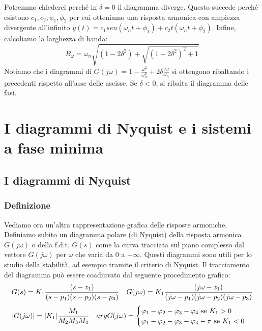 \documentclass[11pt]{article}
\begin{document}
Potremmo chiederci perché in $\delta=0$ il diagramma diverge. Questo succede perché esistono $c_1,c_2, \phi_1, \phi_2$ per cui otteniamo una risposta armonica con ampiezza divergente all'infinito $y(t)=c_1sen(\omega_nt+\phi_1)+c_2t(\omega_nt+\phi_2)$. Infine, calcoliamo la larghezza di banda:
\begin{displaymath}
    B_\omega = \omega_n\sqrt{(1-2\delta^2)+\sqrt{(1-2\delta^2)^2 +1}}
\end{displaymath}
Notiamo che i diagrammi di $G(j\omega) = 1-\frac{\omega^2}{\omega^2_n}+2\delta\frac{j\omega}{\omega_n}$ si ottengono ribaltando i precedenti rispetto all'asse delle ascisse. Se $\delta<0$, si ribalta il diagramma delle fasi.
\section{I diagrammi di Nyquist e i sistemi a fase minima}
\subsection{I diagrammi di Nyquist}
\subsubsection{Definizione}
Vediamo ora un'altra rappresentazione grafica delle risposte armoniche.
Definiamo subito un diagramma polare (di Nyquist) della risposta armonica $G(j\omega)$ o della f.d.t. $G(s)$ come la curva tracciata sul piano complesso dal vettore $G(j\omega)$ per $\omega$ che varia da $0$ a $+\infty$. 
Questi diagrammi sono utili per lo studio della stabilità, ad esempio tramite il criterio di Nyquist. Il tracciamento del diagramma può essere coadiuvato dal seguente procedimento grafico:
\begin{displaymath}
    G(s)=K_1\frac{(s-z_1)}{(s-p_1)(s-p_2)(s-p_3)} \hspace{10px}G(j\omega) = K_1 \frac{(j\omega-z_1)}{(j\omega-p_1)(j\omega-p_2)(j\omega-p_3)}
\end{displaymath}
\begin{displaymath}
    |G(j\omega)| = |K_1|\frac{M_1}{M_2M_3M_4} \hspace{10px}argG(j\omega) = \begin{cases}
    \varphi_1 - \varphi_2 - \varphi_3 - \varphi_4 \textrm{ se }K_1>0\\
    \varphi_1 - \varphi_2 - \varphi_3 - \varphi_4 - \pi \textrm{ se }K_1<0
    \end{cases}
\end{displaymath}
\end{document}
